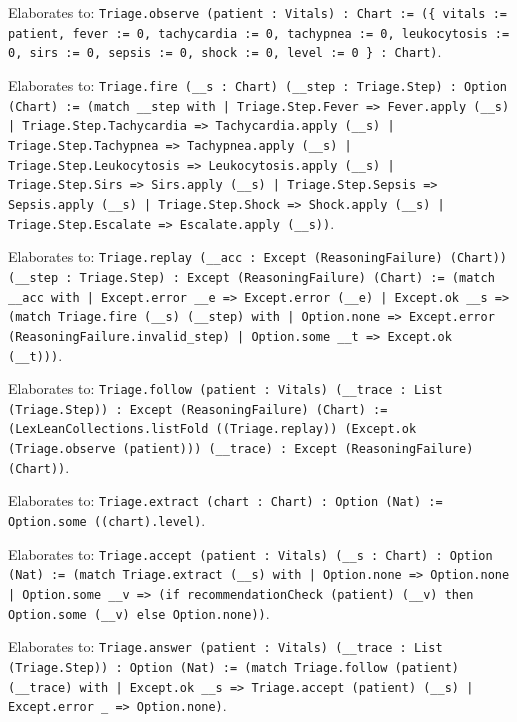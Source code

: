 \documentclass[11pt]{article}
\begin{document}
\noindent Elaborates to: \texttt{Triage.observe (patient : Vitals) : Chart := (\{ vitals := patient, fever := 0, tachycardia := 0, tachypnea := 0, leukocytosis := 0, sirs := 0, sepsis := 0, shock := 0, level := 0 \} : Chart)}.\par
\noindent Elaborates to: \texttt{Triage.fire (\_\_s : Chart) (\_\_step : Triage.Step) : Option (Chart) := (match \_\_step with | Triage.Step.Fever => Fever.apply (\_\_s) | Triage.Step.Tachycardia => Tachycardia.apply (\_\_s) | Triage.Step.Tachypnea => Tachypnea.apply (\_\_s) | Triage.Step.Leukocytosis => Leukocytosis.apply (\_\_s) | Triage.Step.Sirs => Sirs.apply (\_\_s) | Triage.Step.Sepsis => Sepsis.apply (\_\_s) | Triage.Step.Shock => Shock.apply (\_\_s) | Triage.Step.Escalate => Escalate.apply (\_\_s))}.\par
\noindent Elaborates to: \texttt{Triage.replay (\_\_acc : Except (ReasoningFailure) (Chart)) (\_\_step : Triage.Step) : Except (ReasoningFailure) (Chart) := (match \_\_acc with | Except.error \_\_e => Except.error (\_\_e) | Except.ok \_\_s => (match Triage.fire (\_\_s) (\_\_step) with | Option.none => Except.error (ReasoningFailure.invalid\_step) | Option.some \_\_t => Except.ok (\_\_t)))}.\par
\noindent Elaborates to: \texttt{Triage.follow (patient : Vitals) (\_\_trace : List (Triage.Step)) : Except (ReasoningFailure) (Chart) := (LexLeanCollections.listFold ((Triage.replay)) (Except.ok (Triage.observe (patient))) (\_\_trace) : Except (ReasoningFailure) (Chart))}.\par
\noindent Elaborates to: \texttt{Triage.extract (chart : Chart) : Option (Nat) := Option.some ((chart).level)}.\par
\noindent Elaborates to: \texttt{Triage.accept (patient : Vitals) (\_\_s : Chart) : Option (Nat) := (match Triage.extract (\_\_s) with | Option.none => Option.none | Option.some \_\_v => (if recommendationCheck (patient) (\_\_v) then Option.some (\_\_v) else Option.none))}.\par
\noindent Elaborates to: \texttt{Triage.answer (patient : Vitals) (\_\_trace : List (Triage.Step)) : Option (Nat) := (match Triage.follow (patient) (\_\_trace) with | Except.ok \_\_s => Triage.accept (patient) (\_\_s) | Except.error \_ => Option.none)}.\par
\end{document}
